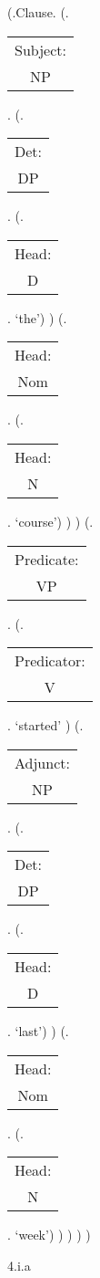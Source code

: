\documentclass[12pt,letterpaper]{article}
\begin{document}
		\begin{figure}
	\begin{center}
		\begin{parsetree}
			(.Clause.
			(.\begin{tabular}{c}Subject:\\NP\end{tabular}.
			(.\begin{tabular}{c}Det:\\DP\end{tabular}.
			(.\begin{tabular}{c}Head:\\D\end{tabular}. `the')
			)
			(.\begin{tabular}{c}Head:\\Nom\end{tabular}.
			(.\begin{tabular}{c}Head:\\N\end{tabular}. `course')
			)
			)
			(.\begin{tabular}{c}Predicate:\\VP\end{tabular}.
			(.\begin{tabular}{c}Predicator:\\V\end{tabular}.    `started' )
			(.\begin{tabular}{c}Adjunct:\\NP\end{tabular}.
			(.\begin{tabular}{c}Det:\\DP\end{tabular}.
			(.\begin{tabular}{c}Head:\\D\end{tabular}. `last')
			)
			(.\begin{tabular}{c}Head:\\Nom\end{tabular}.
			(.\begin{tabular}{c}Head:\\N\end{tabular}. `week')
			)
			)
			)
			)
			
			\hfill \break\hfill \break
		\end{parsetree}
		4.i.a
	\end{center}
\end{figure}
\end{document}
